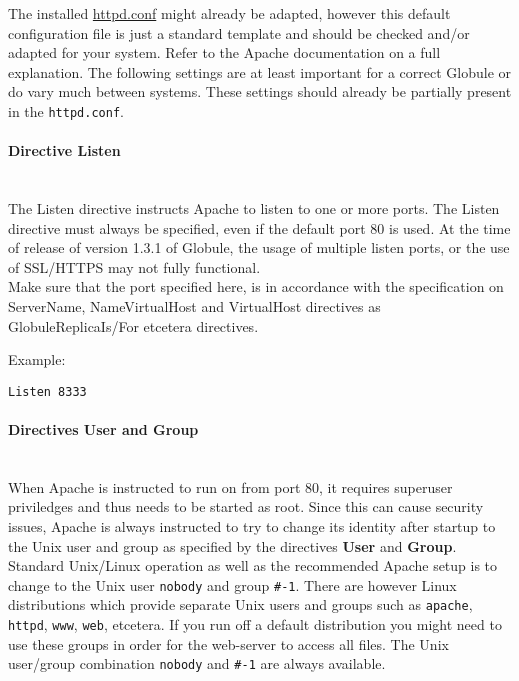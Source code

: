 \documentclass[10pt,a4paper]{article}
\makeatletter
\newenvironment{p}{\@open{P}{}}{\@close{P}}
\newenvironment{p}{}{\par}
\makeatother
\begin{document}
\begin{p}
The installed \url{httpd.conf} might already be adapted, however this default
configuration file is just a standard template and should be checked and/or
adapted for your system.  Refer to the Apache documentation on a full
explanation.  The following settings are at least important for a correct
Globule or do vary much between systems.  These settings should already be
partially present in the \verb!httpd.conf!.
\end{p}

\paragraph{Directive \textbf{Listen}}~\\

\begin{p}
The Listen directive instructs Apache to listen to one or more ports.  The
Listen directive must always be specified, even if the default port 80 is
used.  At the time of release of version 1.3.1 of Globule, the usage of
multiple listen ports, or the use of SSL/HTTPS may not fully functional. \\
Make sure that the port specified here, is in accordance with the
specification on ServerName, NameVirtualHost and VirtualHost directives as
GlobuleReplicaIs/For etcetera directives.
\end{p}

\begin{p}
Example:
\end{p}
\begin{Verbatim}
Listen 8333
\end{Verbatim}

\paragraph{Directives \textbf{User} and \textbf{Group}}~\\

\begin{p}
When Apache is instructed to run on from port 80, it requires superuser
priviledges and thus needs to be started as root.  Since this can cause
security issues, Apache is always instructed to try to change its identity
after startup to the Unix user and group as specified by the directives
\textbf{User} and \textbf{Group}.  Standard Unix/Linux operation as well as
the recommended Apache setup is to change to the Unix user \verb!nobody! and
group \verb!#-1!.  There are however Linux distributions which provide
separate Unix users and groups such as \verb!apache!, \verb!httpd!,
\verb!www!, \verb!web!, etcetera.  If you run off a default distribution you
might need to use these groups in order for the web-server to access all
files.  The Unix user/group combination \verb!nobody! and \verb!#-1! are
always available.
\end{p}
\end{document}
